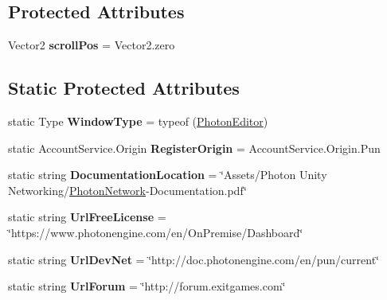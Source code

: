 \subsection*{Protected Attributes}
\begin{DoxyCompactItemize}
\item 
Vector2 {\bfseries scroll\+Pos} = Vector2.\+zero\hypertarget{class_photon_editor_a5229df5b774975987fb48246d81e37aa}{}\label{class_photon_editor_a5229df5b774975987fb48246d81e37aa}

\end{DoxyCompactItemize}
\subsection*{Static Protected Attributes}
\begin{DoxyCompactItemize}
\item 
static Type {\bfseries Window\+Type} = typeof (\hyperlink{class_photon_editor}{Photon\+Editor})\hypertarget{class_photon_editor_a4d9c4354d88e679b621ff016702c44c7}{}\label{class_photon_editor_a4d9c4354d88e679b621ff016702c44c7}

\item 
static Account\+Service.\+Origin {\bfseries Register\+Origin} = Account\+Service.\+Origin.\+Pun\hypertarget{class_photon_editor_a4882839f9ba412f6eeefa90eb4d190e3}{}\label{class_photon_editor_a4882839f9ba412f6eeefa90eb4d190e3}

\item 
static string {\bfseries Documentation\+Location} = \char`\"{}Assets/Photon Unity Networking/\hyperlink{class_photon_network}{Photon\+Network}-\/Documentation.\+pdf\char`\"{}\hypertarget{class_photon_editor_adf8ddba59d3bddf3e49b891d472b9dd2}{}\label{class_photon_editor_adf8ddba59d3bddf3e49b891d472b9dd2}

\item 
static string {\bfseries Url\+Free\+License} = \char`\"{}https\+://www.\+photonengine.\+com/en/On\+Premise/Dashboard\char`\"{}\hypertarget{class_photon_editor_a93dc60253b81669da6cb308d2231d051}{}\label{class_photon_editor_a93dc60253b81669da6cb308d2231d051}

\item 
static string {\bfseries Url\+Dev\+Net} = \char`\"{}http\+://doc.\+photonengine.\+com/en/pun/current\char`\"{}\hypertarget{class_photon_editor_abdf6a9fa996d1f5d8ada5a4bc234a3b9}{}\label{class_photon_editor_abdf6a9fa996d1f5d8ada5a4bc234a3b9}

\item 
static string {\bfseries Url\+Forum} = \char`\"{}http\+://forum.\+exitgames.\+com\char`\"{}\hypertarget{class_photon_editor_afcb7450394c6278d2599f1b9115cc902}{}\label{class_photon_editor_afcb7450394c6278d2599f1b9115cc902}


\end{DoxyCompactItemize}
